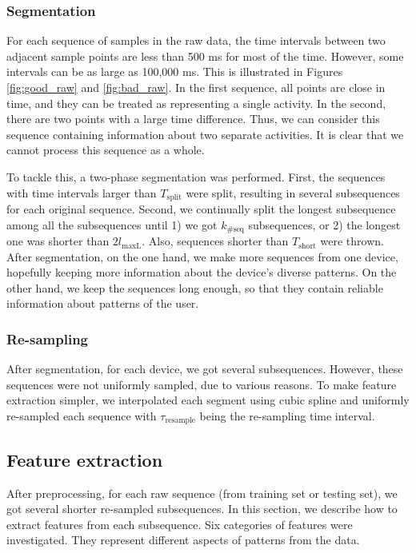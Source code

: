 \documentclass{article} %
\begin{document}
\subsubsection{Segmentation} %
For each sequence of samples in the raw data, the time intervals between two adjacent sample points are less than 500 ms for most of the time. However, some intervals can be as large as 100,000 ms. This is illustrated in Figures \ref{fig:good_raw} and \ref{fig:bad_raw}. In the first sequence, all  points are close in time, and they can be treated as representing a single activity. In the second, there are two points with a large time difference. Thus, we can consider this sequence containing information about two separate activities. It is clear that we cannot process this sequence as a whole. %

To tackle this, a two-phase segmentation was performed. First, the sequences with time intervals larger than $T_\mathrm{split}$ were split, resulting in several subsequences for each original sequence. Second, we continually split the longest subsequence among all the subsequences until 1) we got $k_\mathrm{\#seq}$ subsequences, or 2) the longest one was shorter than $2 l_\mathrm{maxL}$. Also, sequences shorter than $T_\mathrm{short}$ were thrown. After segmentation, on the one hand, we make more sequences from one device, hopefully keeping more information about the device's diverse patterns. On the other hand, we keep the sequences long enough, so that they contain reliable information about patterns of the user.

\subsubsection{Re-sampling} 
After segmentation, for each device, we got several subsequences. However, these sequences were not uniformly sampled, due to various reasons. To make feature extraction simpler, we interpolated each segment using cubic spline and uniformly re-sampled each sequence with  $\tau_\mathrm{resample}$ being the re-sampling time interval.

\subsection{Feature extraction}
\label{feautures}

After preprocessing, for each raw sequence (from training set or testing set), we got several shorter re-sampled subsequences. In this section, we describe how to extract features from each subsequence. Six categories of features were investigated. They represent different aspects of patterns from the data.
\end{document}

